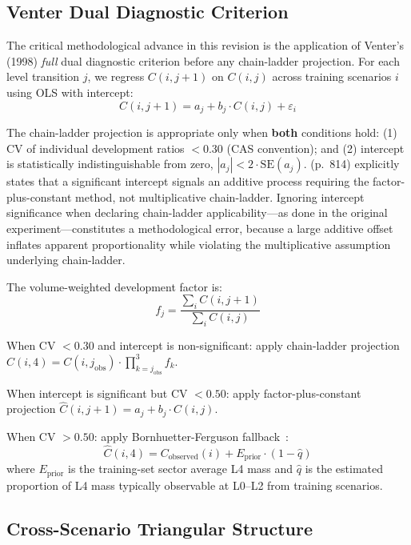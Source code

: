 \documentclass[11pt,letterpaper]{article}
\begin{document}
\subsection{Venter Dual Diagnostic Criterion}

The critical methodological advance in this revision is the application of Venter's (1998) \emph{full} dual diagnostic criterion before any chain-ladder projection. For each level transition $j$, we regress $C(i, j+1)$ on $C(i, j)$ across training scenarios $i$ using OLS with intercept:
\begin{equation}
  C(i, j+1) = a_j + b_j \cdot C(i, j) + \varepsilon_i
\end{equation}

The chain-ladder projection is appropriate only when \textbf{both} conditions hold: (1) CV of individual development ratios $< 0.30$ (CAS convention); and (2) intercept is statistically indistinguishable from zero, $|a_j| < 2 \cdot \mathrm{SE}(a_j)$. \citet{Venter1998} (p.~814) explicitly states that a significant intercept signals an additive process requiring the factor-plus-constant method, not multiplicative chain-ladder. Ignoring intercept significance when declaring chain-ladder applicability---as done in the original experiment---constitutes a methodological error, because a large additive offset inflates apparent proportionality while violating the multiplicative assumption underlying chain-ladder.

The volume-weighted development factor is:
\begin{equation}
  f_j = \frac{\sum_i C(i, j+1)}{\sum_i C(i, j)}
\end{equation}

When CV $< 0.30$ and intercept is non-significant: apply chain-ladder projection $\hat{C}(i, 4) = C(i, j_\text{obs}) \cdot \prod_{k=j_\text{obs}}^{3} f_k$.

When intercept is significant but CV $< 0.50$: apply factor-plus-constant projection $\hat{C}(i, j+1) = a_j + b_j \cdot C(i, j)$.

When CV $> 0.50$: apply Bornhuetter-Ferguson fallback~\citep{Bornhuetter1972}:
\begin{equation}
  \hat{C}(i, 4) = C_\text{observed}(i) + E_\text{prior} \cdot (1 - \hat{q})
\end{equation}
where $E_\text{prior}$ is the training-set sector average L4 mass and $\hat{q}$ is the estimated proportion of L4 mass typically observable at L0--L2 from training scenarios.

\subsection{Cross-Scenario Triangular Structure}
\end{document}
